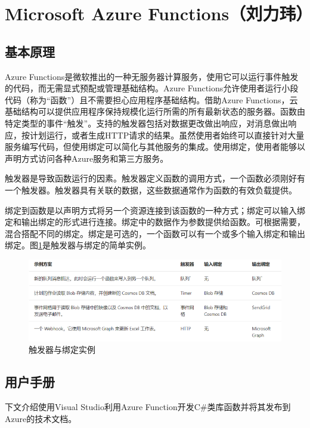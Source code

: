 \section{Microsoft Azure Functions（刘力玮）}
\subsection{基本原理}
Azure Functions是微软推出的一种无服务器计算服务，使用它可以运行事件触发的代码，而无需显式预配或管理基础结构。Azure Functions允许使用者运行小段代码（称为“函数”）且不需要担心应用程序基础结构。借助Azure Functions，云基础结构可以提供应用程序保持规模化运行所需的所有最新状态的服务器。函数由特定类型的事件“触发”。支持的触发器包括对数据更改做出响应，对消息做出响应，按计划运行，或者生成HTTP请求的结果。虽然使用者始终可以直接针对大量服务编写代码，但使用绑定可以简化与其他服务的集成。使用绑定，使用者能够以声明方式访问各种Azure服务和第三方服务。

触发器是导致函数运行的因素。触发器定义函数的调用方式，一个函数必须刚好有一个触发器。触发器具有关联的数据，这些数据通常作为函数的有效负载提供。

绑定到函数是以声明方式将另一个资源连接到该函数的一种方式；绑定可以输入绑定和输出绑定的形式进行连接。绑定中的数据作为参数提供给函数。可根据需要，混合搭配不同的绑定。绑定是可选的，一个函数可以有一个或多个输入绑定和输出绑定。图\ref{fig1}是触发器与绑定的简单实例。

\begin{figure}[!htbp]
	\centering
	\includegraphics[scale=0.6]{figs/1.png}
	\caption{触发器与绑定实例}
	\label{fig1}	
\end{figure}

\subsection{用户手册}
下文介绍使用Visual Studio利用Azure Function开发C\#类库函数并将其发布到 Azure的技术文档。

